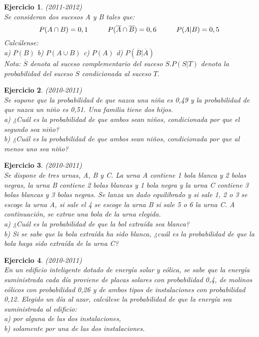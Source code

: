 \documentclass[12pt, a4paper]{amsart}
\newtheorem{ejer}{Ejercicio}
\begin{document}
\begin{ejer}\em (2011-2012)\\
Se consideran dos sucesos A y B tales que:
\[P(A\cap B)=0,1\hspace*{1cm} P(\overline{A}\cap \overline{B})=0,6\hspace*{1cm} P(A|B)=0,5\]
Calcúlense:\\
a) $P(B)$\hspace*{1cm} 
b) $P(A\cup B)$\hspace*{1cm} 
c) $P(A)$\hspace*{1cm} 
d) $P(\overline{B}|\overline{A})$\\
\textit{Nota: $\overline{S}$ denota al suceso complementario del suceso $S. P(S|T)$ denota la probabilidad del suceso $S$ condicionada al suceso $T.$}
\end{ejer}

\begin{ejer}\em (2010-2011)\\
Se supone que la probabilidad de que nazca una niña es 0,49 y la probabilidad de que nazca un niño es 0,51. Una familia tiene dos hijos.\\
a) ¿Cuál es la probabilidad de que ambos sean niños, condicionada por que el segundo sea niño?\\
b) ¿Cuál es la probabilidad de que ambos sean niños, condicionada por que al menos uno sea niño?
\end{ejer}

\begin{ejer}\em (2010-2011)\\
Se dispone de tres urnas, A, B y C. La urna A contiene 1 bola blanca y 2 bolas negras, la urna B contiene 2 bolas blancas y 1 bola negra y la urna C contiene 3 bolas blancas y 3 bolas negras. Se lanza un dado equilibrado y si sale 1, 2 o 3 se escoge la urna A, si sale el 4 se escoge la urna B  si sale 5 o 6 la urna C. A continuación, se extrae una bola de la urna elegida.\\
a) ¿Cuál es la probabilidad de que la bol extraída sea blanca?\\
b) Si se sabe que la bola extraída ha sido blanca, ¿cuál es la probabilidad de que la bola haya sido extraída de la urna C?
\end{ejer}

\begin{ejer}\em (2010-2011)\\
En un edificio inteligente dotado de energía solar y eólica, se sabe que la energía suministrada cada día proviene de placas solares con probabilidad 0,4, de molinos eólicos con probabilidad 0,26 y de ambos tipos de instalaciones con probabilidad 0,12. Elegido un día al azar, calcúlese la probabilidad de que la energía sea suministrada al edificio:\\
a) por alguna de las dos instalaciones,\\
b) solamente por una de las dos instalaciones.
\end{ejer}
\end{document}
